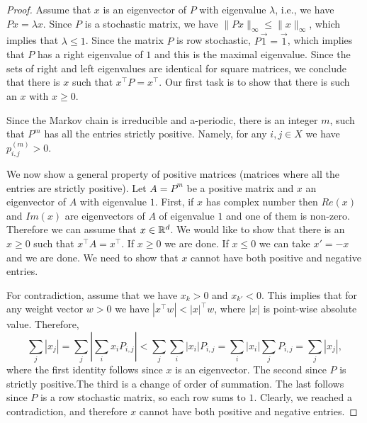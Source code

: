 \begin{proof}
Assume that $x$ is an eigenvector of $P$ with eigenvalue $\lambda$,
i.e., we have $Px=\lambda x$. Since $P$ is a stochastic matrix, we
have $\|P x\|_\infty \leq \|x\|_\infty$, which implies that $\lambda
\leq 1$. Since the matrix $P$ is row stochastic, $P\vec{1}=\vec{1}$,
which implies that $P$ has a right eigenvalue of $1$ and this is the
maximal eigenvalue. Since the sets of right and left eigenvalues are
identical for square matrices, we conclude that there is $x$ such that $x^\top P=x^\top$.
Our first task is to show that there is such an $x$ with $x\geq0$.

Since the Markov chain is irreducible and a-periodic, there is an
integer $m$, such that $P^m$ has all the entries strictly positive.
Namely, for any $i,j\in X$ we have $p^{(m)}_{i,j}>0$.

We now show a general property of positive matrices (matrices where
all the entries are strictly positive). Let $A=P^m$ be a positive
matrix and $x$ an eigenvector of $A$ with eigenvalue $1$. First, if
$x$ has complex number then $Re(x)$ and $Im(x)$ are eigenvectors
of $A$ of eigenvalue $1$ and one of them is non-zero. Therefore we
can assume that $x\in \mathbb{R}^d$. We would like to show that there is
an $x\geq 0$ such that $x^\top A=x^\top$. If $x\geq 0$ we are done.
If $x\leq 0$ we can take $x'=-x$ and we are done. We need to show
that $x$ cannot have both positive and negative entries.

For contradiction, assume that we have $x_{k}>0$ and $x_{k'}<0$.
This implies that for any weight vector $w>0$ we have $|x^\top w| <
|x|^\top w$, where $|x|$ is point-wise absolute value. Therefore,
\[
\sum_j |x_j|= \sum_j |\sum_i x_i P_{i,j}| < \sum_j \sum_i |x_i|
P_{i,j}=  \sum_i |x_i| \sum_j P_{i,j}= \sum_j |x_j|,
\]
where the first identity follows since $x$ is an eigenvector. The
second since $P$ is strictly positive.The third is a change of order
of summation. The last follows since $P$ is a row stochastic matrix, so
each row sums to $1$. Clearly, we reached a contradiction, and
therefore $x$ cannot have both positive and negative entries.

%
%


\end{proof}
